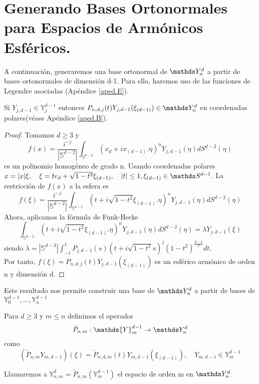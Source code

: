 \section[Generando Bases Ortonormales.]{Generando Bases Ortonormales para Espacios de Armónicos Esféricos.}
A continuación, generaremos una base ortonormal de $\spharm$ a partir de bases ortonormales de dimensión d-1. Para ello, haremos uso de las funciones de Legendre asociadas (Apéndice \ref{aped.E}).

\medskip

\begin{prop}Si $Y_{j,d-1}\in\mathds{Y}_j^{d-1}$ entonces $P_{n,d,j}(t)Y_{j,d-1}(\xi_{(d-1)})\in\spharm$ en coordenadas polares(véase Apéndice \ref{aped.B}).
\end{prop}
\begin{proof}
	
	Tomamos $d\ge3$ y 
	$$
	f(x) = \frac{i^{-j}}{|\mathds{S}^{d-2}|}\int_{\mathds{S}^{d-2}} (x_d+ix_{(d-1)}.\eta)^n Y_{j,d-1}(\eta) d{S}^{d-2}(\eta)
	$$
	es un polinomio homogéneo de grado n. Usando coordenadas polares\\ $x = |x|\xi,\quad \xi= te_d + \sqrt{1-t^2}\xi_{(d-1)}, \quad |t|\le 1, \xi_{(d-1)}\in \sphere$. 
	La restricción de $f(x)$ a la esfera es
	$$
	f(\xi) =  \frac{i^{-j}}{|\mathds{S}^{d-2}|}\int_{\mathds{S}^{d-2}} (t+i\sqrt{1-t^2}\xi_{(d-1)}.\eta)^n Y_{j,d-1}(\eta) dS^{d-2}(\eta)
		$$
		Ahora, aplicamos la fórmula de Funk-Hecke \cite[sec. 2.5]{libro_esfarm}
		$$
		\int_{\mathds{S}^{d-2}} (t+i\sqrt{1-t^2}\xi_{(d-1)}.\eta)^n Y_{j,d-1}(\eta) dS^{d-2}(\eta) = \lambda  Y_{j,d-1}(\xi)
			$$ 
			siendo $\lambda = |\mathds{S}^{d-3}|\int_{-1}^{1} P_{j,d-1}(s)(t+i\sqrt{1-t^2}s)^j(1-t^2)^{\frac{d-4}{2}}dt$.\\
			
			Por tanto, $f(\xi) = P_{n,d,j}(t)Y_{j,d-1}(\xi_{(d-1)})$ es un esférico armónico de orden n y dimensión d.
\end{proof}
Este resultado nos permite construir una base de $\spharm$ a partir de bases de $\mathds{Y}_{0}^{d-1},...,\mathds{Y}_{n}^{d-1}$
\begin{defn}
Para $d\ge3$ y $m\le n$ definimos el operador $$ \tilde{P}_{n,m} : \mathds{Y}_m^{d-1} \to \spharm
$$
como
$$
(\tilde{P}_{n,m}Y_{m,d-1})(\xi) = \tilde{P}_{n,d,m}(t)Y_{m,d-1}(\xi_{(d-1)}), \quad Y_{m,d-1} \in \mathds{Y}_m^{d-1}
$$
\end{defn}
Llamaremos a $\mathds{Y}^d_{n,m} = \tilde{P}_{n,m}(\mathds{Y}_{m}^{d-1})$  el espacio de orden m en $\spharm$. \medskip

